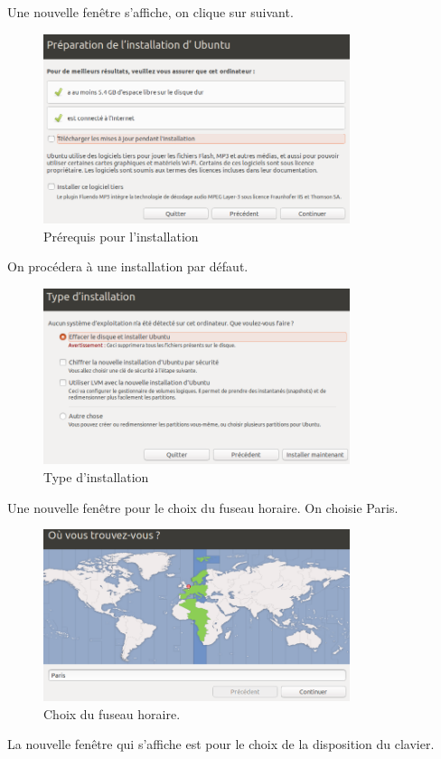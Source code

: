 \documentclass[11pt,a4paper,titlepage, oneside]{article}
\begin{document}
		Une nouvelle fenêtre s'affiche, on clique sur suivant.
		
		 \begin{figure}[htp]
                        \centering
                        \includegraphics[width=0.8\textwidth,natwidth=610,natheight=642]{images/demarrerISO2.png}
                        \caption{Prérequis pour l'installation}
         \end{figure}
	
		On procédera à une installation par défaut.
		
		 \begin{figure}[htp]
                        \centering
                        \includegraphics[width=0.8\textwidth,natwidth=610,natheight=642]{images/demarrerISO3.png}
                        \caption{Type d'installation}
                \end{figure}
		
	\newpage
		Une nouvelle fenêtre pour le choix du fuseau horaire. On choisie Paris.
		 \begin{figure}[htp]
                        \centering
                        \includegraphics[width=0.8\textwidth,natwidth=610,natheight=642]{images/demarrerISO4.png}
                        \caption{Choix du fuseau horaire.}
                \end{figure}
	\newpage
		La nouvelle fenêtre qui s'affiche est pour le choix de la disposition du clavier.
\end{document}
